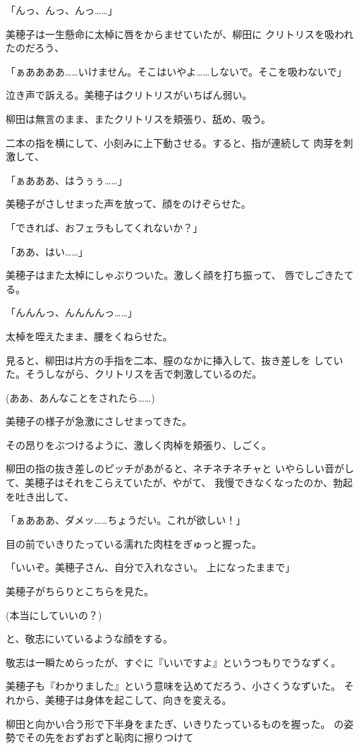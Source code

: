 ﻿\documentclass[
    book,tate,
    line_length=30zw,
    jafontsize=12pt,
    paper=b5j,
    landscape,
    ]{jlreq}
\begin{document}
「んっ、んっ、んっ……」

美穂子は一生懸命に太棹に唇をからませていたが、柳田に
クリトリスを吸われたのだろう、

「ぁああああ……いけません。そこはいやよ……しないで。そこを吸わないで」

泣き声で訴える。美穂子はクリトリスがいちばん弱い。

柳田は無言のまま、またクリトリスを頬張り、舐め、吸う。

二本の指を横にして、小刻みに上下動させる。すると、指が連続して
肉芽を刺激して、

「ぁあああ、はうぅぅ……」

美穂子がさしせまった声を放って、顔をのけぞらせた。

「できれば、おフェラもしてくれないか？」

「ああ、はい……」

美穂子はまた太棹にしゃぶりついた。激しく顔を打ち振って、
唇でしごきたてる。

「んんんっ、んんんんっ……」

太棹を咥えたまま、腰をくねらせた。

見ると、柳田は片方の手指を二本、膣のなかに挿入して、抜き差しを
していた。そうしながら、クリトリスを舌で刺激しているのだ。

(ああ、あんなことをされたら……)

美穂子の様子が急激にさしせまってきた。

その昂りをぶつけるように、激しく肉棹を頬張り、しごく。

柳田の指の抜き差しのピッチがあがると、ネチネチネチャと
いやらしい音がして、美穂子はそれをこらえていたが、やがて、
我慢できなくなったのか、勃起を吐き出して、

「ぁあああ、ダメッ……ちょうだい。これが欲しい！」

目の前でいきりたっている濡れた肉柱をぎゅっと握った。

「いいぞ。美穂子さん、自分で入れなさい。 上になったままで」

美穂子がちらりとこちらを見た。

(本当にしていいの？)

と、敬志にいているような顔をする。

敬志は一瞬ためらったが、すぐに『いいですよ』というつもりでうなずく。

美穂子も『わかりました』という意味を込めてだろう、小さくうなずいた。
それから、美穂子は身体を起こして、向きを変える。

柳田と向かい合う形で下半身をまたぎ、いきりたっているものを握った。
の姿勢でその先をおずおずと恥肉に擦りつけて
\end{document}
